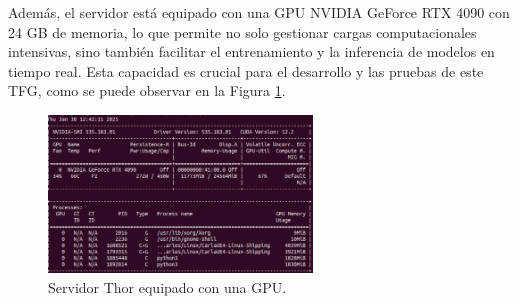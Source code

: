 Además, el servidor está equipado con una \ac{GPU} NVIDIA GeForce RTX 4090 con 24 GB de memoria, lo que permite no solo gestionar cargas computacionales intensivas, sino también facilitar el entrenamiento y la inferencia de modelos en tiempo real. Esta capacidad es crucial para el desarrollo y las pruebas de este \ac{TFG}, como se puede observar en la Figura \ref{fig:thor_nvidia}.

\begin{figure}[ht]
  \centering
  \includegraphics[width=7cm]{figs/Plataformas_Desarollo/thor.png}
  \caption{Servidor Thor equipado con una \ac{GPU}.}
  \label{fig:thor_nvidia}
\end{figure}









